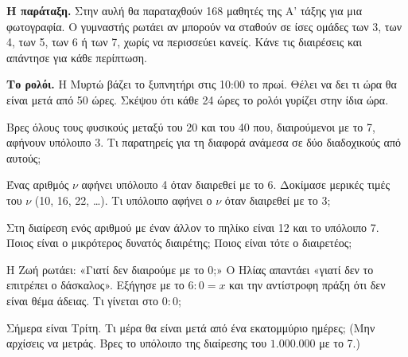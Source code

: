 \ex \textbf{Η παράταξη.} Στην αυλή θα παραταχθούν 168 μαθητές της Α’ τάξης για μια φωτογραφία. Ο γυμναστής ρωτάει αν μπορούν να σταθούν σε ίσες ομάδες των 3, των 4, των 5, των 6 ή των 7, χωρίς να περισσεύει κανείς. Κάνε τις διαιρέσεις και απάντησε για κάθε περίπτωση.

\ex \textbf{Το ρολόι.} Η Μυρτώ βάζει το ξυπνητήρι στις 10:00 το πρωί. Θέλει να δει τι ώρα θα είναι μετά από 50 ώρες. Σκέψου ότι κάθε 24 ώρες το ρολόι γυρίζει στην ίδια ώρα.


\ex Βρες όλους τους φυσικούς μεταξύ του 20 και του 40 που, διαιρούμενοι με το 7, αφήνουν υπόλοιπο 3. Τι παρατηρείς για τη διαφορά ανάμεσα σε δύο διαδοχικούς από αυτούς;

\ex Ένας αριθμός $\nu$ αφήνει υπόλοιπο 4 όταν διαιρεθεί με το 6. Δοκίμασε μερικές τιμές του $\nu$ (10, 16, 22, \dots). Τι υπόλοιπο αφήνει ο $\nu$ όταν διαιρεθεί με το 3;

\ex Στη διαίρεση ενός αριθμού με έναν άλλον το πηλίκο είναι 12 και το υπόλοιπο 7. Ποιος είναι ο μικρότερος δυνατός διαιρέτης; Ποιος είναι τότε ο διαιρετέος;

\ex Η Ζωή ρωτάει: «Γιατί δεν διαιρούμε με το 0;» Ο Ηλίας απαντάει «γιατί δεν το επιτρέπει ο δάσκαλος». Εξήγησε με το $6:0=x$ και την αντίστροφη πράξη ότι δεν είναι θέμα άδειας. Τι γίνεται στο $0:0$;

\ex Σήμερα είναι Τρίτη. Τι μέρα θα είναι μετά από ένα εκατομμύριο ημέρες; (Μην αρχίσεις να μετράς. Βρες το υπόλοιπο της διαίρεσης του $1.000.000$ με το 7.)

